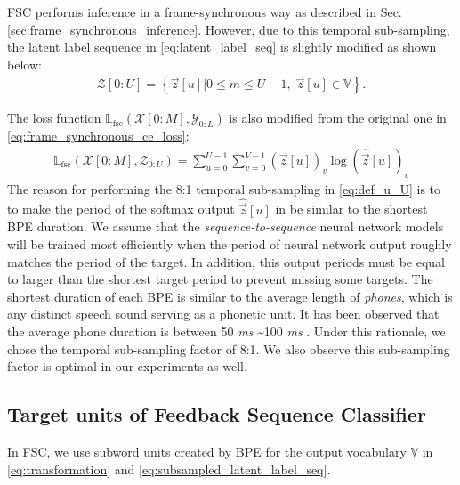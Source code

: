 \documentclass{article}
\begin{document}
FSC performs inference in a frame-synchronous way as described in 
Sec. \ref{sec:frame_synchronous_inference}. 
However, due to this temporal sub-sampling, the latent label sequence 
in \eqref{eq:latent_label_seq} is slightly modified as shown below:
\begin{align}
  \mathcal{Z}[0:U]  =  
    \left\{\vec{z}[u]  \Big| 0 \le m \le U-1, \; \vec{z}[u] \in \mathbb{V} \right\}.
  \label{eq:subsampled_latent_label_seq}
\end{align}


The loss function 
$\mathbb{L}_{\text{fsc}}\left(\mathcal{X}[0:M], \mathcal{Y}_{0:L}\right)$ 
is also modified from the original one in 
\eqref{eq:frame_synchronous_ce_loss}:
\begin{align}
	\mathbb{L}_{\text{fsc}}
    \left(\mathcal{X}[0:M], \mathcal{Z}_{0:U}\right)
      = \sum_{u=0}^{U-1}  
          \sum_{v=0}^{V-1}
          {(\vec{z}[u])_v}  \log ( 
             \widehat{\vec{z}}[u] )_v  
        \label{eq:fsc_ce_loss} 
\end{align}
The reason for performing the 8:1 temporal sub-sampling in \eqref{eq:def_u_U} is to 
to make the period of the softmax output $\widehat{\vec{z}}[u]$ in \label{eq:fsc_ce_loss} 
be similar to the shortest BPE duration. We assume that the {\it sequence-to-sequence}
neural network models will be trained most efficiently when the period of neural 
network output roughly matches the period of the target. In addition, this
output periods must be equal to larger than the shortest target period to prevent
missing some targets.
The shortest duration of each BPE is similar to the average length of {\it phones}, 
which is any distinct speech sound serving as a phonetic unit.
It has been observed that the average phone duration is between 50 {\it ms}
\textasciitilde 100 {\it ms} \cite{x_wang_icslp_1996_00, z_bartosz_ltc_2009_00}.
Under this rationale, we chose the temporal sub-sampling factor of 8:1. 
We also observe this sub-sampling factor is optimal in our experiments as well.

\subsection{Target units of Feedback Sequence Classifier}
\label{sec:target_units}

In FSC, we use subword units created by BPE \cite{r_sennrich_acl_2016_00} for
the output vocabulary $\mathbb{V}$ in 
\eqref{eq:transformation} and \eqref{eq:subsampled_latent_label_seq}. 
\end{document}
